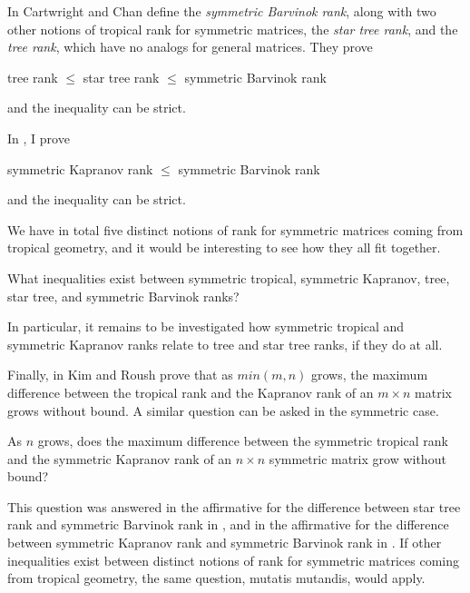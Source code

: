 \documentclass{article}
\begin{document}
In \cite{cc} Cartwright and Chan define the \emph{symmetric Barvinok rank}, along with two other notions of tropical rank for symmetric matrices, the \emph{star tree rank}, and the \emph{tree rank}, which have no analogs for general matrices. They prove
\begin{center}
  tree rank $\leq$ star tree rank $\leq$ symmetric Barvinok rank
\end{center}
and the inequality can be strict.

In \cite{z}, I prove
\begin{center}
  symmetric Kapranov rank $\leq$ symmetric Barvinok rank
\end{center}
and the inequality can be strict.

We have in total five distinct notions of rank for symmetric matrices coming from tropical geometry, and it would be interesting to see how they all fit together.

\begin{question}
  What inequalities exist between symmetric tropical, symmetric Kapranov, tree, star tree, and symmetric Barvinok ranks?
\end{question}
In particular, it remains to be investigated how symmetric tropical and symmetric Kapranov ranks relate to tree and star tree ranks, if they do at all. 

Finally, in \cite{kr} Kim and Roush prove that as $min(m,n)$ grows, the maximum difference between the tropical rank and the Kapranov rank of an $m \times n$ matrix grows without bound. A similar question can be asked in the symmetric case.

\begin{question}
  As $n$ grows, does the maximum difference between the symmetric tropical rank and the symmetric Kapranov rank of an $n \times n$ symmetric matrix grow without bound?
\end{question}

This question was answered in the affirmative for the difference between star tree rank and symmetric Barvinok rank in \cite{cc}, and in the affirmative for the difference between symmetric Kapranov rank and symmetric Barvinok rank in \cite{z}. If other inequalities exist between distinct notions of rank for symmetric matrices coming from tropical geometry, the same question, mutatis mutandis, would apply. 
\end{document}
